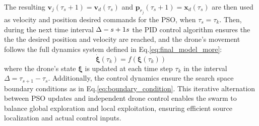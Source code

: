 \noindent
\\
The resulting $\mathbf{v}_{j}(\tau_s+1) = \mathbf{v}_d(\tau_s)$ and $\mathbf{p}_{r_j}(\tau_s + 1) = \mathbf{x}_d(\tau_s)$
are then used as velocity and position desired commands for the PSO, when 
$\tau_s = \tau_k$.
Then, during the next time interval $\Delta \def \tau_{s+1} - \tau_s$ the PID
control algorithm ensures the the the desired position and velocity are reached,
and the drone's movement follows the full dynamics system defined in 
Eq.\ref{eq:final_model_more}:
\begin{equation}
    \dot{\mathbf{\xi}}(\tau_k) = f(\mathbf{\xi}(\tau_k))
\end{equation}
where the drone’s state $\mathbf{\xi}$ is updated at each time step $\tau_k$ in the 
interval $\Delta = \tau_{s+1} - \tau_s$.
Additionally, the control dynamics ensure the 
search space boundary conditions as in
Eq.\ref{eq:boundary_condition}.
This iterative alternation between PSO updates and 
independent drone 
control enables the swarm to balance global 
exploration and local exploitation, 
ensuring efficient source localization and actual 
control inputs.

